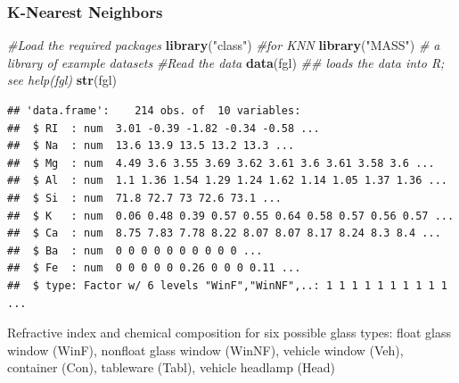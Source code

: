 \documentclass[
  shownotes,
  xcolor={svgnames},
  hyperref={colorlinks,citecolor=DarkBlue,linkcolor=DarkRed,urlcolor=DarkBlue}
  , aspectratio=169]{beamer}
\newenvironment{Shaded}{\begin{snugshade}}{\end{snugshade}}
\newcommand{\CommentTok}[1]{\textcolor[rgb]{0.56,0.35,0.01}{\textit{#1}}}
\newcommand{\KeywordTok}[1]{\textcolor[rgb]{0.13,0.29,0.53}{\textbf{#1}}}
\newcommand{\NormalTok}[1]{#1}
\newcommand{\StringTok}[1]{\textcolor[rgb]{0.31,0.60,0.02}{#1}}
\begin{document}
\begin{frame}[fragile]
\frametitle{K-Nearest Neighbors}

\begin{scriptsize}
\begin{Shaded}
\begin{Highlighting}[]
\CommentTok{\#Load the required packages}
\KeywordTok{library}\NormalTok{(}\StringTok{"class"}\NormalTok{) }\CommentTok{\#for KNN}
\KeywordTok{library}\NormalTok{(}\StringTok{"MASS"}\NormalTok{) }\CommentTok{\# a library of example datasets}
\CommentTok{\#Read the data}
\KeywordTok{data}\NormalTok{(fgl) }\CommentTok{\#\# loads the data into R; see help(fgl)}
\KeywordTok{str}\NormalTok{(fgl)}
\end{Highlighting}
\end{Shaded}
\end{scriptsize}

\begin{tiny}
\begin{verbatim}
## 'data.frame':    214 obs. of  10 variables:
##  $ RI  : num  3.01 -0.39 -1.82 -0.34 -0.58 ...
##  $ Na  : num  13.6 13.9 13.5 13.2 13.3 ...
##  $ Mg  : num  4.49 3.6 3.55 3.69 3.62 3.61 3.6 3.61 3.58 3.6 ...
##  $ Al  : num  1.1 1.36 1.54 1.29 1.24 1.62 1.14 1.05 1.37 1.36 ...
##  $ Si  : num  71.8 72.7 73 72.6 73.1 ...
##  $ K   : num  0.06 0.48 0.39 0.57 0.55 0.64 0.58 0.57 0.56 0.57 ...
##  $ Ca  : num  8.75 7.83 7.78 8.22 8.07 8.07 8.17 8.24 8.3 8.4 ...
##  $ Ba  : num  0 0 0 0 0 0 0 0 0 0 ...
##  $ Fe  : num  0 0 0 0 0 0.26 0 0 0 0.11 ...
##  $ type: Factor w/ 6 levels "WinF","WinNF",..: 1 1 1 1 1 1 1 1 1 1 ...
\end{verbatim}
\end{tiny}
\begin{tiny}
Refractive index and chemical composition for six possible glass types: float glass window (WinF), nonfloat glass window (WinNF), vehicle window (Veh), container (Con), tableware (Tabl), vehicle headlamp (Head)
\end{tiny}



\end{frame}
\end{document}
